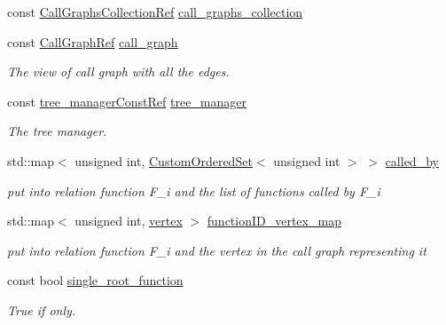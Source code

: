\begin{DoxyCompactItemize}
\item 
const \hyperlink{call__graph_8hpp_afccdc7a00d60cb4ee70f44b223f858bb}{Call\+Graphs\+Collection\+Ref} \hyperlink{classCallGraphManager_a09ff858c02243ff6cec04659e65d5bb4}{call\+\_\+graphs\+\_\+collection}
\item 
const \hyperlink{call__graph_8hpp_a58f2b421619a32f5c5bc35e64f3346d3}{Call\+Graph\+Ref} \hyperlink{classCallGraphManager_a32789cf408b416672af0758e44efa45c}{call\+\_\+graph}
\begin{DoxyCompactList}\small\item\em The view of call graph with all the edges. \end{DoxyCompactList}\item 
const \hyperlink{tree__manager_8hpp_a792e3f1f892d7d997a8d8a4a12e39346}{tree\+\_\+manager\+Const\+Ref} \hyperlink{classCallGraphManager_a9018abdd8aee3716e816c2854860dc1b}{tree\+\_\+manager}
\begin{DoxyCompactList}\small\item\em The tree manager. \end{DoxyCompactList}\item 
std\+::map$<$ unsigned int, \hyperlink{classCustomOrderedSet}{Custom\+Ordered\+Set}$<$ unsigned int $>$ $>$ \hyperlink{classCallGraphManager_a61a98173b9b7f8c3058227eb3e371d5c}{called\+\_\+by}
\begin{DoxyCompactList}\small\item\em put into relation function F\+\_\+i and the list of functions called by F\+\_\+i \end{DoxyCompactList}\item 
std\+::map$<$ unsigned int, \hyperlink{graph_8hpp_abefdcf0544e601805af44eca032cca14}{vertex} $>$ \hyperlink{classCallGraphManager_ad632d9efbc89d01b3073d7a8236aec31}{function\+I\+D\+\_\+vertex\+\_\+map}
\begin{DoxyCompactList}\small\item\em put into relation function F\+\_\+i and the vertex in the call graph representing it \end{DoxyCompactList}\item 
const bool \hyperlink{classCallGraphManager_a84c91d6640ac211ba1d4286d16dcd5d1}{single\+\_\+root\+\_\+function}
\begin{DoxyCompactList}\small\item\em True if only. \end{DoxyCompactList}\item 

\end{DoxyCompactItemize}
